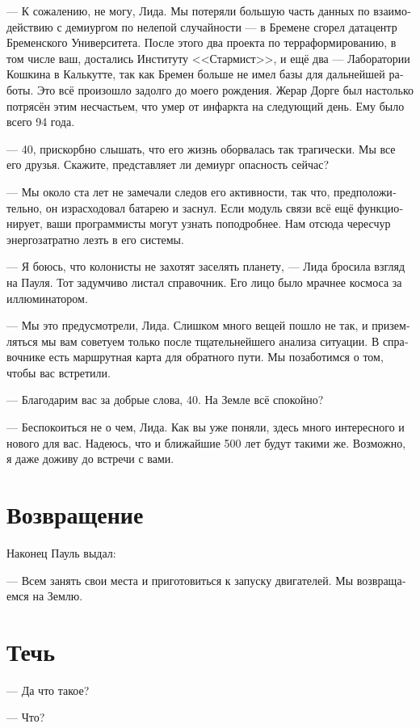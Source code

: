 \documentclass[a4paper,12pt,fleqn]{book}\usepackage{polyglossia}\setdefaultlanguage[babelshorthands=true]{russian}\setotherlanguage{english}\defaultfontfeatures{Ligatures=TeX,Mapping=tex-text}\usepackage{xcolor}\newcommand{\ml}[3]{#2}
\begin{document}
--- К сожалению, не могу, Лида.
Мы потеряли большую часть данных по взаимодействию с демиургом по нелепой случайности --- в Бремене сгорел датацентр Бременского Университета.
После этого два проекта по терраформированию, в том числе ваш, достались Институту <<Стармист>>, и ещё два --- Лаборатории Кошкина в Калькутте, так как Бремен больше не имел базы для дальнейшей работы.
Это всё произошло задолго до моего рождения.
Жерар Дорге был настолько потрясён этим несчастьем, что умер от инфаркта на следующий день.
Ему было всего 94 года.

--- 40, прискорбно слышать, что его жизнь оборвалась так трагически.
Мы все его друзья.
Скажите, представляет ли демиург опасность сейчас?

--- Мы около ста лет не замечали следов его активности, так что, предположительно, он израсходовал батарею и заснул.
Если модуль связи всё ещё функционирует, ваши программисты могут узнать поподробнее.
Нам отсюда чересчур энергозатратно лезть в его системы.

--- Я боюсь, что колонисты не захотят заселять планету, --- Лида бросила взгляд на Пауля.
Тот задумчиво листал справочник.
Его лицо было мрачнее космоса за иллюминатором.

--- Мы это предусмотрели, Лида.
Слишком много вещей пошло не так, и приземляться мы вам советуем только после тщательнейшего анализа ситуации.
В справочнике есть маршрутная карта для обратного пути.
Мы позаботимся о том, чтобы вас встретили.

--- Благодарим вас за добрые слова, 40.
На Земле всё спокойно?

--- Беспокоиться не о чем, Лида.
Как вы уже поняли, здесь много интересного и нового для вас.
Надеюсь, что и ближайшие 500 лет будут такими же.
Возможно, я даже доживу до встречи с вами.

\section{Возвращение}

Наконец Пауль выдал:

--- Всем занять свои места и приготовиться к запуску двигателей.
Мы возвращаемся на Землю.

\section{Течь}

--- Да что такое?

--- Что?
\end{document}
